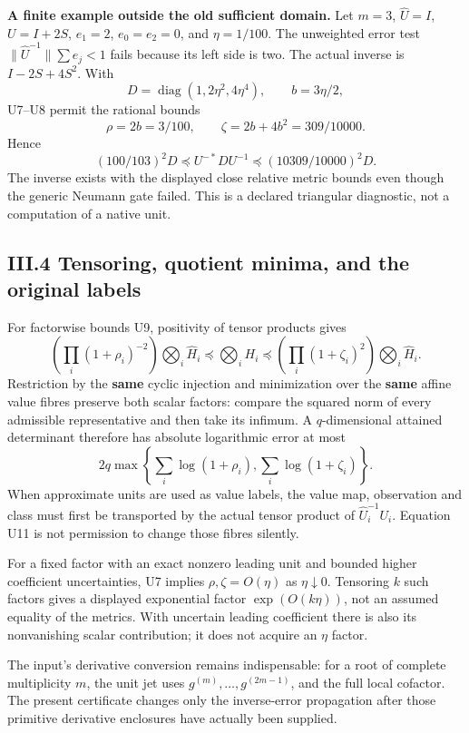 \textbf{A finite example outside the old sufficient domain.} Let \(m=3\), \(\widehat U=I\), \(U=I+2S\), \(e_1=2\), \(e_0=e_2=0\), and \(\eta=1/100\). The unweighted error test \(\|\widehat U^{-1}\|\sum e_j<1\) fails because its left side is two. The actual inverse is \(I-2S+4S^2\). With \[
 D=\operatorname{diag}(1,2\eta^2,4\eta^4),\qquad b=3\eta/2,
\] U7--U8 permit the rational bounds \[
 \rho=2b=3/100,\qquad
 \zeta=2b+4b^2=309/10000.
\] Hence \[
 (100/103)^2D\preceq U^{-*}DU^{-1}
 \preceq(10309/10000)^2D.
 \tag{U10}
\] The inverse exists with the displayed close relative metric bounds even though the generic Neumann gate failed. This is a declared triangular diagnostic, not a computation of a native unit.

\subsection{III.4 Tensoring, quotient minima, and the original labels}\label{iii.4-tensoring-quotient-minima-and-the-original-labels}

For factorwise bounds U9, positivity of tensor products gives \[
 \boxed{\left(\prod_i(1+\rho_i)^{-2}\right)
 \bigotimes_i\widehat H_i
 \preceq\bigotimes_iH_i
 \preceq
 \left(\prod_i(1+\zeta_i)^2\right)
 \bigotimes_i\widehat H_i.}
 \tag{U11}
\] Restriction by the \textbf{same} cyclic injection and minimization over the \textbf{same} affine value fibres preserve both scalar factors: compare the squared norm of every admissible representative and then take its infimum. A \(q\)-dimensional attained determinant therefore has absolute logarithmic error at most \[
 \boxed{2q\max\left\{\sum_i\log(1+\rho_i),
                        \sum_i\log(1+\zeta_i)\right\}.}
 \tag{U12}
\] When approximate units are used as value labels, the value map, observation and class must first be transported by the actual tensor product of \(\widehat U_i^{-1}U_i\). Equation U11 is not permission to change those fibres silently.

For a fixed factor with an exact nonzero leading unit and bounded higher coefficient uncertainties, U7 implies \(\rho,\zeta=O(\eta)\) as \(\eta\downarrow0\). Tensoring \(k\) such factors gives a displayed exponential factor \(\exp(O(k\eta))\), not an assumed equality of the metrics. With uncertain leading coefficient there is also its nonvanishing scalar contribution; it does not acquire an \(\eta\) factor.

The input's derivative conversion remains indispensable: for a root of complete multiplicity \(m\), the unit jet uses \(g^{(m)},\ldots,g^{(2m-1)}\), and the full local cofactor. The present certificate changes only the inverse-error propagation after those primitive derivative enclosures have actually been supplied.
